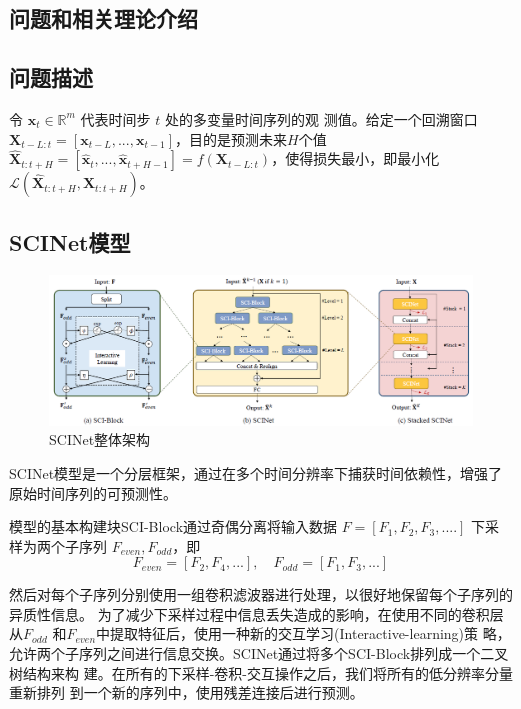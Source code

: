 \documentclass[twoside,a4paper]{article}
\begin{document}
\begin{CJK*}{UTF8}{gkai}

  \section{问题和相关理论介绍}
  \subsection{问题描述}
  令 $\mathbf x_t\in\mathbb R^m$ 代表时间步 $t$ 处的多变量时间序列的观
  测值。给定一个回溯窗口 $\mathbf X_{t-L:t}=[\mathbf
  x_{t-L},...,\mathbf x_{t-1}]$，目的是预测未来$H$个值 $\hat {\mathbf
    X}_{t:t+H}=[\hat{\mathbf x}_{t},...,\hat{\mathbf
    x}_{t+H-1}]=f(\mathbf X_{t-L:t})$，使得损失最小，即最小化
  $\mathcal L(\hat {\mathbf X}_{t:t+H},\mathbf X_{t:t+H})$。

  \subsection{SCINet模型}
  \begin{figure}[ht]
\centering
\includegraphics[scale=0.45]{pics/SCINet.png}
\caption{SCINet整体架构}
\end{figure}

SCINet模型是一个分层框架，通过在多个时间分辨率下捕获时间依赖性，增强了
原始时间序列的可预测性。


模型的基本构建块SCI-Block通过奇偶分离将输入数据 $F=[F_1,F_2,F_3,....]$
下采样为两个子序列 $F_{even},F_{odd}$，即
\begin{equation}
  F_{even}=[F_2,F_4,...],\quad F_{odd}=[F_1,F_3,...]
\end{equation}

然后对每个子序列分别使用一组卷积滤波器进行处理，以很好地保留每个子序列的异质性信息。
为了减少下采样过程中信息丢失造成的影响，在使用不同的卷积层从$F_{odd}$
和$F_{even}$中提取特征后，使用一种新的交互学习(Interactive-learning)策
略，允许两个子序列之间进行信息交换。SCINet通过将多个SCI-Block排列成一个二叉树结构来构
建。在所有的下采样-卷积-交互操作之后，我们将所有的低分辨率分量重新排列
到一个新的序列中，使用残差连接后进行预测。


\end{CJK*}
\end{document}
